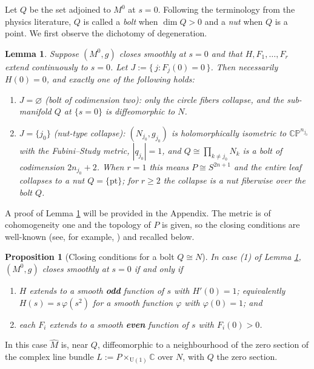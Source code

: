 \documentclass[11pt]{amsart}
\theoremstyle{plain}
\numberwithin{equation}{section}
\newtheorem{proposition}[theorem]{Proposition}
\newtheorem{lemma}[theorem]{Lemma}
\theoremstyle{definition}
\theoremstyle{remark}
\begin{document}
Let $Q$ be the set adjoined to $M^0$ at $s=0$.  Following the terminology from the physics literature, $Q$ is called a \emph{bolt} when $\dim Q > 0$ and a \emph{nut} when $Q$ is a point. We first observe the dichotomy of degeneration.  

\begin{lemma}\label{lem:bolt-nut-dichotomy}
	Suppose $(M^0, g)$ closes smoothly at $s = 0$ and that $H, F_1, \dots, F_r$ extend continuously to $s = 0$. Let $J := \{\, j : F_j(0) = 0 \,\}$. Then necessarily $H(0) = 0$, and exactly one of the following holds:
	
	\begin{enumerate}
		\item $J = \varnothing$ (\emph{bolt of codimension two}): only the circle fibers collapse, and the sub-manifold $Q$ at $\{s=0\}$ is diffeomorphic to $N$.
		\item $J = \{ j_0 \}$ (\emph{nut-type collapse}): $(N_{j_0}, g_{j_0})$ is holomorphically isometric to $\mathbb{CP}^{n_{j_0}}$ with the Fubini--Study metric, $|q_{j_0}| = 1$, and $Q \cong \prod_{k \neq j_0} N_k$ is a bolt of codimension $2 n_{j_0} + 2$. When $r = 1$ this means $P \cong S^{2n+1}$ and the entire leaf collapses to a \emph{nut} $Q = \{ \mathrm{pt} \}$; for $r \geq 2$ the collapse is a nut \emph{fiberwise over} the bolt $Q$.%
	\end{enumerate}
	
\end{lemma}
 A proof of Lemma \ref{lem:bolt-nut-dichotomy} will be provided in the Appendix. The metric is of cohomogeneity one and the topology of $P$ is given, so the closing conditions are well-known (see, for example, \cite{VZ, DW1998}) and recalled below. 
\begin{proposition}[Closing conditions for a bolt $Q \cong N$]\label{prop:bolt-closing}
	In case (1) of Lemma \ref{lem:bolt-nut-dichotomy}, $(M^0, g)$ closes smoothly at $s = 0$ if and only if
	
	\begin{enumerate}
		\item $H$ extends to a smooth \textbf{odd} function of $s$ with $H'(0) = 1$; equivalently $H(s) = s\, \varphi(s^2)$ for a smooth function $\varphi$ with $\varphi(0) = 1$; and
		\item each $F_i$ extends to a smooth \textbf{even} function of $s$ with $F_i(0) > 0$.
	\end{enumerate}
\end{proposition}
\noindent In this case $\widehat{M}$ is, near $Q$, diffeomorphic to a neighbourhood of the zero section of the complex line bundle $L := P \times_{\mathrm{U}(1)} \mathbb{C}$ over $N$, with $Q$ the zero section.\\
\end{document}
